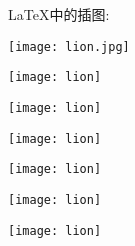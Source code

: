 \documentclass[a4paper, oneside]{ctexart}
\begin{document}
	\LaTeX{}中的插图:

	\texttt{[image: lion.jpg]}	%
	
	\texttt{[image: lion]}	%

	\texttt{[image: lion]}

	\texttt{[image: lion]}

	\texttt{[image: lion]}
	
	\texttt{[image: lion]}

	\texttt{[image: lion]}
\end{document}

